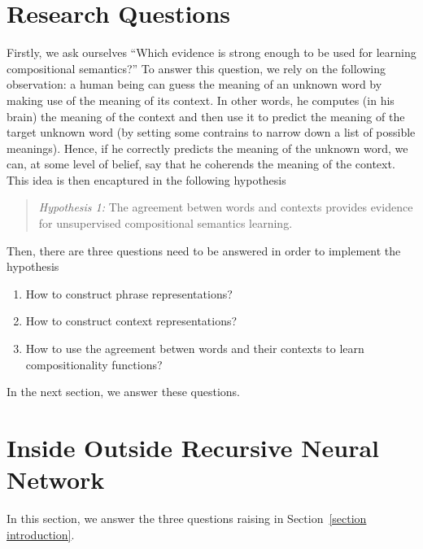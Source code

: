 \documentclass[11pt]{article}
\begin{document}
\section{Research Questions}
\label{section question}

Firstly, we ask ourselves ``Which evidence is strong enough to be used for 
learning compositional semantics?'' To answer this question, we rely on the 
following observation: a human being can guess the meaning of an unknown 
word by making use of the meaning of its context. In other words, he computes 
(in his brain) the meaning of the context and then use it to predict the meaning 
of the target unknown word (by setting some contrains to narrow down a list of 
possible meanings). Hence, if he correctly predicts the meaning of the unknown word, 
we can, at some level of belief, say that he coherends the meaning of the context. 
This idea is then encaptured in the following hypothesis
\begin{quote}
\textit{Hypothesis 1:} The agreement betwen words and contexts provides evidence for unsupervised 
compositional semantics learning. 
\end{quote}

Then, there are three questions need to be answered in order to implement the 
hypothesis
\begin{enumerate}
	\item How to construct phrase representations?
	\item How to construct context representations?
	\item How to use the agreement betwen words and 
	their contexts to learn compositionality functions?
\end{enumerate}
In the next section, we answer these questions.


\section{Inside Outside Recursive Neural Network}
\label{section iornn}

In this section, we answer the three questions raising in Section~\ref{section introduction}.
\end{document}
